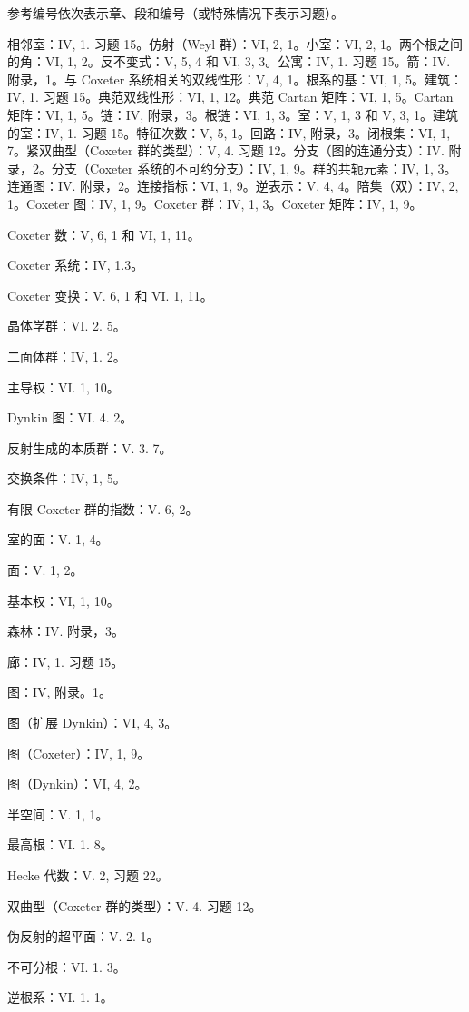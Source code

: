 
参考编号依次表示章、段和编号（或特殊情况下表示习题）。

相邻室：IV, 1. 习题 15。仿射（Weyl 群）：VI, 2, 1。小室：VI, 2, 1。两个根之间的角：VI, 1, 2。反不变式：V, 5, 4 和 VI, 3, 3。公寓：IV, 1. 习题 15。箭：IV. 附录，1。与 Coxeter 系统相关的双线性形：V, 4, 1。根系的基：VI, 1, 5。建筑：IV, 1. 习题 15。典范双线性形：VI, 1, 12。典范 Cartan 矩阵：VI, 1, 5。Cartan 矩阵：VI, 1, 5。链：IV, 附录，3。根链：VI, 1, 3。室：V, 1, 3 和 V, 3, 1。建筑的室：IV, 1. 习题 15。特征次数：V, 5, 1。回路：IV, 附录，3。闭根集：VI, 1, 7。紧双曲型（Coxeter 群的类型）：V, 4. 习题 12。分支（图的连通分支）：IV. 附录，2。分支（Coxeter 系统的不可约分支）：IV, 1, 9。群的共轭元素：IV, 1, 3。连通图：IV. 附录，2。连接指标：VI, 1, 9。逆表示：V, 4, 4。陪集（双）：IV, 2, 1。Coxeter 图：IV, 1, 9。Coxeter 群：IV, 1, 3。Coxeter 矩阵：IV, 1, 9。

Coxeter 数：V, 6, 1 和 VI, 1, 11。

Coxeter 系统：IV, 1.3。

Coxeter 变换：V. 6, 1 和 VI. 1, 11。

晶体学群：VI. 2. 5。

二面体群：IV, 1. 2。

主导权：VI. 1, 10。

Dynkin 图：VI. 4. 2。

反射生成的本质群：V. 3. 7。

交换条件：IV, 1, 5。

有限 Coxeter 群的指数：V. 6, 2。

室的面：V. 1, 4。

面：V. 1, 2。

基本权：VI, 1, 10。

森林：IV. 附录，3。

廊：IV, 1. 习题 15。

图：IV, 附录。1。

图（扩展 Dynkin）：VI, 4, 3。

图（Coxeter）：IV, 1, 9。

图（Dynkin）：VI, 4, 2。

半空间：V. 1, 1。

最高根：VI. 1. 8。

Hecke 代数：V. 2, 习题 22。

双曲型（Coxeter 群的类型）：V. 4. 习题 12。

伪反射的超平面：V. 2. 1。

不可分根：VI. 1. 3。

逆根系：VI. 1. 1。

